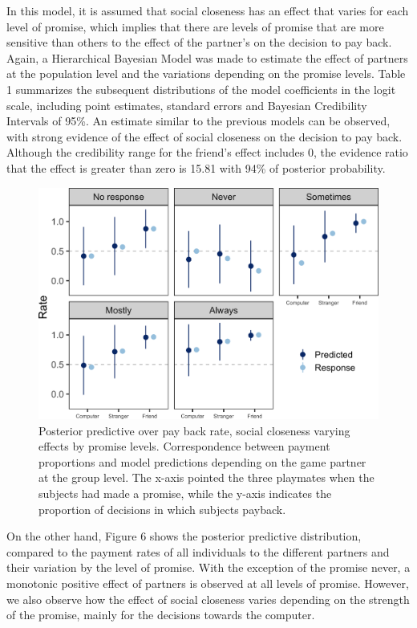 \documentclass[smallextended]{svjour3}       %
\begin{document}
In this model, it is assumed that social closeness has an effect that
varies for each level of promise, which implies that there are levels of
promise that are more sensitive than others to the effect of the
partner's on the decision to pay back. Again, a Hierarchical Bayesian
Model was made to estimate the effect of partners at the population
level and the variations depending on the promise levels. Table 1
summarizes the subsequent distributions of the model coefficients in the
logit scale, including point estimates, standard errors and Bayesian
Credibility Intervals of 95\%. An estimate similar to the previous
models can be observed, with strong evidence of the effect of social
closeness on the decision to pay back. Although the credibility range
for the friend's effect includes 0, the evidence ratio that the effect
is greater than zero is 15.81 with 94\% of posterior probability.

\begin{figure}

{\centering \includegraphics[width=0.8\linewidth]{behavioral-promises_files/figure-latex/fig6-1} 

}

\caption{Posterior predictive over pay back rate, social closeness varying effects by promise levels. Correspondence between payment proportions and model predictions depending on the game partner at the group level. The x-axis pointed the three playmates when the subjects had made a promise, while the y-axis indicates the proportion of decisions in which subjects payback.}\label{fig:fig6}
\end{figure}

On the other hand, Figure 6 shows the posterior predictive distribution,
compared to the payment rates of all individuals to the different
partners and their variation by the level of promise. With the exception
of the promise never, a monotonic positive effect of partners is
observed at all levels of promise. However, we also observe how the
effect of social closeness varies depending on the strength of the
promise, mainly for the decisions towards the computer.
\end{document}
